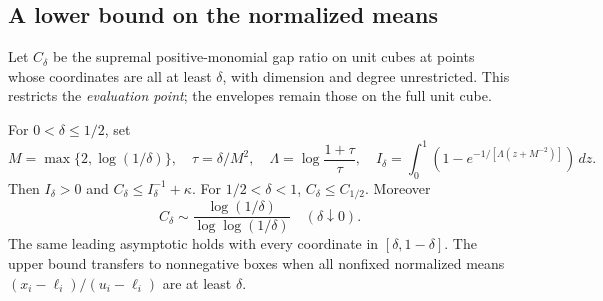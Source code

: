 \subsection{A lower bound on the normalized means}
Let $C_\delta$ be the supremal positive-monomial gap ratio on unit cubes
at points whose coordinates are all at least $\delta$, with dimension
and degree unrestricted. This restricts the \emph{evaluation point}; the
envelopes remain those on the full unit cube.

\begin{theorem}\label{thm:marginal-floor}
For $0<\delta\le1/2$, set
\[
 M=\max\{2,\log(1/\delta)\},\quad \tau=\delta/M^2,\quad
 \Lambda=\log\frac{1+\tau}{\tau},\quad
 I_\delta=\int_0^1\left(1-e^{-1/[\Lambda(z+M^{-2})]}\right)\,dz.
\]
Then $I_\delta>0$ and $C_\delta\le I_\delta^{-1}+\kappa$.
For $1/2<\delta<1$, $C_\delta\le C_{1/2}$. Moreover
\[
 C_\delta\sim\frac{\log(1/\delta)}{\log\log(1/\delta)}
 \quad(\delta\downarrow0).
\]
The same leading asymptotic holds with every coordinate in
$[\delta,1-\delta]$. The upper bound transfers to nonnegative boxes when
all nonfixed normalized means $(x_i-\ell_i)/(u_i-\ell_i)$ are at least
$\delta$.
\end{theorem}
